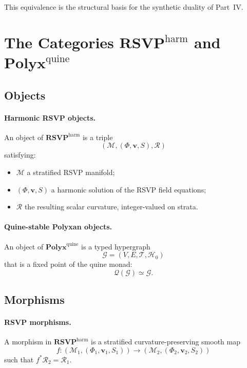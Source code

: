 This equivalence is the structural basis for the synthetic duality of Part~IV.



\section{The Categories \texorpdfstring{$\mathbf{RSVP}^{\mathrm{harm}}$}{RSVP\^harm} and \texorpdfstring{$\mathbf{Polyx}^{\mathrm{quine}}$}{Polyx\^quine}}

\subsection{Objects}

\paragraph{Harmonic RSVP objects.}
An object of $\mathbf{RSVP}^{\mathrm{harm}}$ is a triple
\[
(\mathcal{M}, (\Phi,\mathbf{v},S), \mathcal{R})
\]
satisfying:

\begin{itemize}
\item $\mathcal{M}$ a stratified RSVP manifold;
\item $(\Phi,\mathbf{v},S)$ a harmonic solution of the RSVP field equations;
\item $\mathcal{R}$ the resulting scalar curvature, integer-valued on strata.
\end{itemize}

\paragraph{Quine-stable Polyxan objects.}
An object of $\mathbf{Polyx}^{\mathrm{quine}}$ is a typed hypergraph
\[
\mathcal{G} = (V,E,\mathscr{T},\mathcal{H}_0)
\]
that is a fixed point of the quine monad:
\[
\mathcal{Q}(\mathcal{G}) \simeq \mathcal{G}.
\]

\subsection{Morphisms}

\paragraph{RSVP morphisms.}
A morphism in $\mathbf{RSVP}^{\mathrm{harm}}$ is a stratified
curvature-preserving smooth map
\[
f : (\mathcal{M}_1,(\Phi_1,\mathbf{v}_1,S_1)) \to
    (\mathcal{M}_2,(\Phi_2,\mathbf{v}_2,S_2))
\]
such that $f^\ast \mathcal{R}_2 = \mathcal{R}_1$.

